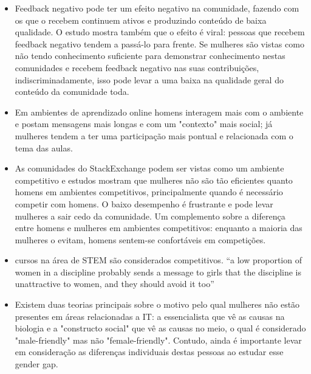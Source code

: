 \begin{itemize}
	\item Feedback negativo pode ter um efeito negativo na comunidade, fazendo com os que o recebem continuem ativos e produzindo conteúdo de baixa qualidade\cite{cheng2014community}. O estudo mostra também que o efeito é viral: pessoas que recebem feedback negativo tendem a passá-lo para frente. Se mulheres são vistas como não tendo conhecimento suficiente para demonstrar conhecimento nestas comunidades e recebem feedback negativo nas suas contribuições, indiscriminadamente, isso pode levar a uma baixa na qualidade geral do conteúdo da comunidade toda. 
	\item Em ambientes de aprendizado online homens interagem mais com o ambiente e postam mensagens mais longas e com um "contexto" mais social; já mulheres tendem a ter uma participação mais pontual e relacionada com o tema das aulas.\cite{barrett1999gender}
	\item As comunidades do StackExchange podem ser vistas como um ambiente competitivo e estudos mostram que mulheres não são tão eficientes quanto homens em ambientes competitivos, principalmente quando é necessário competir com homens\cite{gneezy2003performance}. O baixo desempenho é frustrante e pode levar mulheres a sair cedo da comunidade. Um complemento sobre a diferença entre homens e mulheres em ambientes competitivos: enquanto a maioria das mulheres o evitam, homens sentem-se confortáveis em competições.\cite{niederle2005women}\cite{croson2009gender}
	\item cursos na área de STEM são considerados competitivos. “a low proportion of women in a discipline probably sends a message to girls that the discipline is unattractive to women, and they should avoid it too” \cite{shapiro2011major}
	\item Existem duas teorias principais sobre o motivo pelo qual mulheres não estão presentes em áreas relacionadas a IT: a essencialista que vê as causas na biologia e a "constructo social" que vê as causas no meio, o qual é considerado "male-friendly" mas não "female-friendly". Contudo, ainda é importante levar em consideração as diferenças individuais destas pessoas ao estudar esse gender gap.\cite{trauth2004understanding}
\end{itemize}

